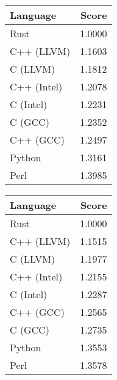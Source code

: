 \begin{subtable}{0.33\textwidth}
    \centering
    \caption{$k=3$}
    \label{table:energy:dfa_gap(3)}
    \begin{tabular}{|l|r|}
        \hline
        Language & Score \\
        \hline
        Rust & 1.0000 \\
        C++ (LLVM) & 1.1603 \\
        C (LLVM) & 1.1812 \\
        C++ (Intel) & 1.2078 \\
        C (Intel) & 1.2231 \\
        C (GCC) & 1.2352 \\
        C++ (GCC) & 1.2497 \\
        Python & 1.3161 \\
        Perl & 1.3985 \\
        \hline
    \end{tabular}
\end{subtable}
\begin{subtable}{0.33\textwidth}
    \centering
    \caption{$k=4$}
    \label{table:energy:dfa_gap(4)}
    \begin{tabular}{|l|r|}
        \hline
        Language & Score \\
        \hline
        Rust & 1.0000 \\
        C++ (LLVM) & 1.1515 \\
        C (LLVM) & 1.1977 \\
        C++ (Intel) & 1.2155 \\
        C (Intel) & 1.2287 \\
        C++ (GCC) & 1.2565 \\
        C (GCC) & 1.2735 \\
        Python & 1.3553 \\
        Perl & 1.3578 \\
        \hline
    \end{tabular}
\end{subtable}%
